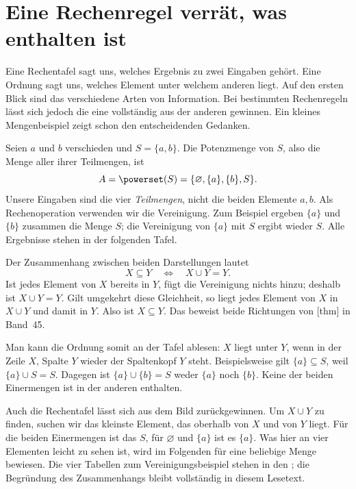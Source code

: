 \section*{Eine Rechenregel verrät, was enthalten ist}
\hypertarget{semilattice.reading.example}{}

Eine Rechentafel sagt uns, welches Ergebnis zu zwei Eingaben gehört.
Eine Ordnung sagt uns, welches Element unter welchem anderen liegt.
Auf den ersten Blick sind das verschiedene Arten von Information.
Bei bestimmten Rechenregeln lässt sich jedoch die eine vollständig
aus der anderen gewinnen. Ein kleines Mengenbeispiel zeigt schon
den entscheidenden Gedanken.

Seien \(a\) und \(b\) verschieden und \(S=\{a,b\}\). Die
Potenzmenge von \(S\), also die Menge aller ihrer Teilmengen, ist
\[
  A=\powerset(S)=\{\varnothing,\{a\},\{b\},S\}.
\]
Unsere Eingaben sind die vier \emph{Teilmengen}, nicht die beiden
Elemente \(a,b\). Als Rechenoperation verwenden wir die Vereinigung.
Zum Beispiel ergeben \(\{a\}\) und \(\{b\}\) zusammen die Menge
\(S\); die Vereinigung von \(\{a\}\) mit \(S\) ergibt wieder
\(S\). Alle Ergebnisse stehen in der folgenden Tafel.

\SemilatticeExampleDiagram

Der Zusammenhang zwischen beiden Darstellungen lautet
\begin{equation}
  X\subseteq Y\quad\Longleftrightarrow\quad X\cup Y=Y.
  \tag{V}\label{semilattice-reading-union}
\end{equation}
Ist jedes Element von \(X\) bereits in \(Y\), fügt die
Vereinigung nichts hinzu; deshalb ist \(X\cup Y=Y\). Gilt
umgekehrt diese Gleichheit, so liegt jedes Element von \(X\)
in \(X\cup Y\) und damit in \(Y\). Also ist \(X\subseteq Y\).
Das beweist beide Richtungen von
[thm] in Band~45.

Man kann die Ordnung somit an der Tafel ablesen: \(X\) liegt
unter \(Y\), wenn in der Zeile \(X\), Spalte \(Y\) wieder
der Spaltenkopf \(Y\) steht. Beispielsweise gilt
\(\{a\}\subseteq S\), weil \(\{a\}\cup S=S\). Dagegen
ist \(\{a\}\cup\{b\}=S\) weder \(\{a\}\) noch \(\{b\}\).
Keine der beiden Einermengen ist in der anderen enthalten.

Auch die Rechentafel lässt sich aus dem Bild zurückgewinnen. Um
\(X\cup Y\) zu finden, suchen wir das kleinste Element, das
oberhalb von \(X\) und von \(Y\) liegt. Für die beiden
Einermengen ist das \(S\), für \(\varnothing\) und
\(\{a\}\) ist es \(\{a\}\). Was hier an vier Elementen leicht
zu sehen ist, wird im Folgenden für eine beliebige Menge bewiesen.
Die vier Tabellen zum Vereinigungsbeispiel stehen in den
\SemilatticeProofsLink{}; die Begründung des Zusammenhangs bleibt
vollständig in diesem Lesetext.

